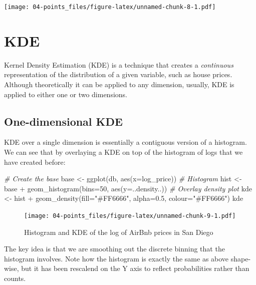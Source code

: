 \documentclass[
]{book}
\newenvironment{Shaded}{\begin{snugshade}}{\end{snugshade}}
\newcommand{\AttributeTok}[1]{\textcolor[rgb]{0.77,0.63,0.00}{#1}}
\newcommand{\CommentTok}[1]{\textcolor[rgb]{0.56,0.35,0.01}{\textit{#1}}}
\newcommand{\DecValTok}[1]{\textcolor[rgb]{0.00,0.00,0.81}{#1}}
\newcommand{\FloatTok}[1]{\textcolor[rgb]{0.00,0.00,0.81}{#1}}
\newcommand{\FunctionTok}[1]{\textcolor[rgb]{0.00,0.00,0.00}{#1}}
\newcommand{\NormalTok}[1]{#1}
\newcommand{\OtherTok}[1]{\textcolor[rgb]{0.56,0.35,0.01}{#1}}
\newcommand{\SpecialCharTok}[1]{\textcolor[rgb]{0.00,0.00,0.00}{#1}}
\newcommand{\StringTok}[1]{\textcolor[rgb]{0.31,0.60,0.02}{#1}}
\begin{document}
\texttt{[image: 04-points\_files/figure-latex/unnamed-chunk-8-1.pdf]}

\hypertarget{kde}{%
\section{KDE}\label{kde}}

Kernel Density Estimation (KDE) is a technique that creates a \emph{continuous} representation of the distribution of a given variable, such as house prices. Although theoretically it can be applied to any dimension, usually, KDE is applied to either one or two dimensions.

\hypertarget{one-dimensional-kde}{%
\subsection{One-dimensional KDE}\label{one-dimensional-kde}}

KDE over a single dimension is essentially a contiguous version of a histogram. We can see that by overlaying a KDE on top of the histogram of logs that we have created before:

\begin{Shaded}
\begin{Highlighting}[]
\CommentTok{\# Create the base}
\NormalTok{base }\OtherTok{\textless{}{-}} \FunctionTok{ggplot}\NormalTok{(db, }\FunctionTok{aes}\NormalTok{(}\AttributeTok{x=}\NormalTok{log\_price))}
\CommentTok{\# Histogram}
\NormalTok{hist }\OtherTok{\textless{}{-}}\NormalTok{ base }\SpecialCharTok{+} 
  \FunctionTok{geom\_histogram}\NormalTok{(}\AttributeTok{bins=}\DecValTok{50}\NormalTok{, }\FunctionTok{aes}\NormalTok{(}\AttributeTok{y=}\NormalTok{..density..))}
\CommentTok{\# Overlay density plot}
\NormalTok{kde }\OtherTok{\textless{}{-}}\NormalTok{ hist }\SpecialCharTok{+} 
  \FunctionTok{geom\_density}\NormalTok{(}\AttributeTok{fill=}\StringTok{"\#FF6666"}\NormalTok{, }\AttributeTok{alpha=}\FloatTok{0.5}\NormalTok{, }\AttributeTok{colour=}\StringTok{"\#FF6666"}\NormalTok{)}
\NormalTok{kde}
\end{Highlighting}
\end{Shaded}

\begin{figure}
\centering
\texttt{[image: 04-points\_files/figure-latex/unnamed-chunk-9-1.pdf]}
\caption{\label{fig:unnamed-chunk-9}Histogram and KDE of the log of AirBnb prices in San Diego}
\end{figure}

The key idea is that we are smoothing out the discrete binning that the histogram involves. Note how the histogram is exactly the same as above shape-wise, but it has been rescalend on the Y axis to reflect probabilities rather than counts.
\end{document}
